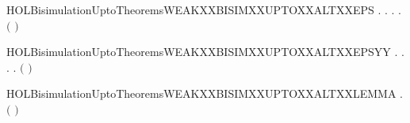 \begin{SaveVerbatim}{HOLBisimulationUptoTheoremsWEAKXXBISIMXXUPTOXXALTXXEPS}
\HOLTokenTurnstile{} \HOLSymConst{\HOLTokenForall{}}.
         \HOLSymConst{\HOLTokenImp{}}
       \HOLSymConst{\HOLTokenForall{}} .
              \HOLSymConst{\HOLTokenImp{}}
           \HOLSymConst{\HOLTokenForall{}}.
                  \HOLSymConst{\HOLTokenImp{}}
               \HOLSymConst{\HOLTokenExists{}}.
                      \HOLSymConst{\HOLTokenConj{}}
                   \ensuremath{(}    \ensuremath{)}  
\end{SaveVerbatim}
\newcommand{\HOLBisimulationUptoTheoremsWEAKXXBISIMXXUPTOXXALTXXEPS}{\UseVerbatim{HOLBisimulationUptoTheoremsWEAKXXBISIMXXUPTOXXALTXXEPS}}
\begin{SaveVerbatim}{HOLBisimulationUptoTheoremsWEAKXXBISIMXXUPTOXXALTXXEPSYY}
\HOLTokenTurnstile{} \HOLSymConst{\HOLTokenForall{}}.
         \HOLSymConst{\HOLTokenImp{}}
       \HOLSymConst{\HOLTokenForall{}} .
              \HOLSymConst{\HOLTokenImp{}}
           \HOLSymConst{\HOLTokenForall{}}.
                  \HOLSymConst{\HOLTokenImp{}}
               \HOLSymConst{\HOLTokenExists{}}.
                      \HOLSymConst{\HOLTokenConj{}}
                   \ensuremath{(}    \ensuremath{)}  
\end{SaveVerbatim}
\newcommand{\HOLBisimulationUptoTheoremsWEAKXXBISIMXXUPTOXXALTXXEPSYY}{\UseVerbatim{HOLBisimulationUptoTheoremsWEAKXXBISIMXXUPTOXXALTXXEPSYY}}
\begin{SaveVerbatim}{HOLBisimulationUptoTheoremsWEAKXXBISIMXXUPTOXXALTXXLEMMA}
\HOLTokenTurnstile{} \HOLSymConst{\HOLTokenForall{}}.
         \HOLSymConst{\HOLTokenImp{}}
        \ensuremath{(}    \ensuremath{)}
\end{SaveVerbatim}
